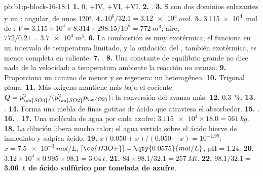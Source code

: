 \begin{solution}{pb:b1:p-block-16-18:1}
\textbf{1.} 0, $+$IV, $+$VI, $+$VI.
\textbf{2.} .
\textbf{3.} S con dos dominios enlazantes y un : angular,
de unos
\ang{120}.
\textbf{4.} $10^6/32.1 = \qty{3.12e4}{mol}$.
\textbf{5.} \qty{3.115e4}{mol} de : $V = 3.115 \times 10^4 \times
8.314 \times 298.15/10^5 = \qty{772}{m^3}$; aire, $772/0.21 = \qty{3.7e3}{m^3}$.
\textbf{6.} La combustión es muy exotérmica; el  funciona en
un intervalo de temperatura limitado, y la oxidación del ,
también exotérmica, es menos completa en caliente.
\textbf{7.} .
\textbf{8.} Una constante de equilibrio grande no dice nada de la
velocidad: a temperatura ambiente la reacción no avanza.
\textbf{9.} Proporciona un camino de menor  y se
regenera: un  heterogéneo.
\textbf{10.} Trigonal plana.
\textbf{11.} Más oxígeno mantiene más bajo el cociente
$Q = p_{\ce{SO3}}^2/(p_{\ce{SO2}}^2 p_{\ce{O2}})$: la conversión del
 avanza más.
\textbf{12.} \qty{0.3}{\percent}.
\textbf{13.} .
\textbf{14.} Forma una niebla de finas gotitas de ácido que atraviesa el
absorbedor.
\textbf{15.} .
\textbf{16.} .
\textbf{17.} Una molécula de agua por cada azufre:
$\num{3.115e4} \times 18.0 =
\qty{561}{kg}$.
\textbf{18.} La dilución libera mucho calor; el agua vertida sobre el
ácido hierve de inmediato y salpica ácido.
\textbf{19.} $x(0.050 + x)/(0.050 - x) = 10^{-1.99}$: $x = \qty{7.5e-3}{mol/L}$,
$[\ce{H3O+}] = \qty{0.0575}{mol/L}$, $\mathrm{pH} = 1.24$.
\textbf{20.} $3.12 \times 10^4 \times 0.995 \times 98.1 = \qty{3.04}{t}$.
\textbf{21.} $84 \times 98.1/32.1 = \qty{257}{Mt}$.
\textbf{22.} $98.1/32.1 =$ \textbf{\qty{3.06}{t} de ácido sulfúrico por
tonelada de azufre}.
\end{solution}

